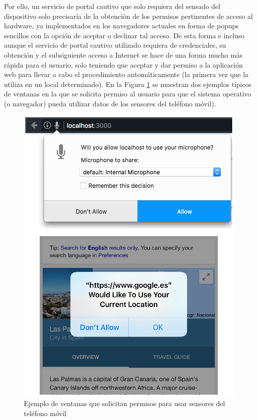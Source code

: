 Por ello, un servicio de portal cautivo que solo requiera del sensado del dispositivo solo precisaría de la obtención de los permisos pertinentes de acceso al hardware, ya implementados en los navegadores actuales en forma de popups sencillos con la opción de aceptar o declinar tal acceso. De esta forma e incluso aunque el servicio de portal cautivo utilizado requiera de credenciales, su obtención y el subsiguiente acceso a Internet se hace de una forma mucho más rápida para el usuario, solo teniendo que aceptar y dar permiso a la aplicación web para llevar a cabo el procedimiento automáticamente (la primera vez que la utiliza en un local determinado). En la Figura \ref{LocationMicPermissions} se muestran dos ejemplos típicos de ventanas en la que se solicita permiso al usuario para que el sistema operativo (o navegador) pueda utilizar datos de los sensores del teléfono móvil).

\begin{figure}[!t]
\begin{center}
\includegraphics[width=0.75\linewidth]{./2_SensadoCol/Img/LocationMicPermissions.png}
\end{center}
\caption{Ejemplo de ventanas que solicitan permisos para usar sensores del teléfono móvil}
\label{LocationMicPermissions}
\end{figure}

